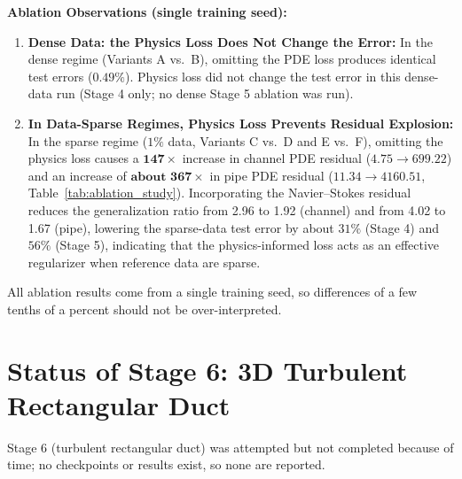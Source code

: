\documentclass[11pt,a4paper]{article}
\begin{document}
\noindent\textbf{Ablation Observations (single training seed):}
\begin{enumerate}[leftmargin=1.5em]
    \item \textbf{Dense Data: the Physics Loss Does Not Change the Error:} In the dense regime (Variants A vs.\ B), omitting the PDE loss produces identical test errors ($0.49\%$). Physics loss did not change the test error in this dense-data run (Stage 4 only; no dense Stage 5 ablation was run).
    \item \textbf{In Data-Sparse Regimes, Physics Loss Prevents Residual Explosion:} In the sparse regime ($1\%$ data, Variants C vs.\ D and E vs.\ F), omitting the physics loss causes a $\mathbf{147\times}$ increase in channel PDE residual ($4.75 \to 699.22$) and an increase of $\mathbf{\text{about } 367\times}$ in pipe PDE residual ($11.34 \to 4160.51$, Table~\ref{tab:ablation_study}). Incorporating the Navier--Stokes residual reduces the generalization ratio from 2.96 to 1.92 (channel) and from 4.02 to 1.67 (pipe), lowering the sparse-data test error by about $31\%$ (Stage 4) and $56\%$ (Stage 5), indicating that the physics-informed loss acts as an effective regularizer when reference data are sparse.
\end{enumerate}

All ablation results come from a single training seed, so differences of a few tenths of a percent should not be over-interpreted.

\section{Status of Stage 6: 3D Turbulent Rectangular Duct}
\label{sec:stage6}
Stage 6 (turbulent rectangular duct) was attempted but not completed because of time; no checkpoints or results exist, so none are reported.

\end{document}
